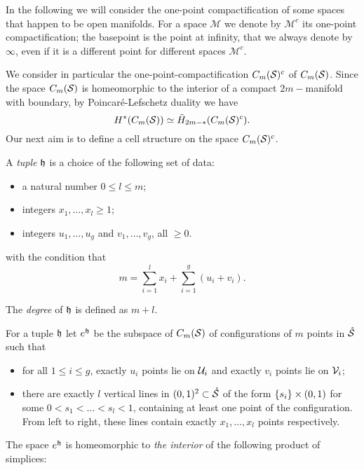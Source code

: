 In the following we will consider the one-point compactification of some spaces that
happen to be open manifolds. For a space $\mathcal{M}$ we denote by $\mathcal{M}^c$ its one-point
compactification; the basepoint is the point at infinity, that we always denote by $\infty$, even
if it is a different point for different spaces $\mathcal{M}^c$.

We consider in particular the one-point-compactification $C_m(\mathcal{S})^c$ of $C_m(\mathcal{S})$.
Since the space $C_m(\mathcal{S})$ is homeomorphic to the interior of a compact
$2m-$manifold with boundary, by Poincaré-Lefschetz
duality we have
\[
 H^*(C_m(\mathcal{S}))\simeq \tilde H_{2m-*}(C_m(\mathcal{S})^c).
\]
Our next aim is to define a cell structure on the space $C_m(\mathcal{S})^c$.
\begin{defn}
\label{defn:ehopen}
A \emph{tuple} $\mathfrak{h}$ is a choice of the following set of data:
 \begin{itemize}
  \item a natural number $0\leq l\leq m$;
  \item integers $x_1,\dots,x_l\geq 1$;
  \item integers $u_1,\dots,u_g$ and $v_1,\dots,v_g$, all $\geq 0$.
 \end{itemize}
with the condition that
\[
 m=\sum_{i=1}^lx_i+\sum_{i=1}^g(u_i+v_i).
\]

The \emph{degree} of $\mathfrak{h}$ is defined as $m+l$.

For a tuple $\mathfrak{h}$ let $e^{\mathfrak{h}}$ be the subspace
of $C_m(\mathcal{S})$ of configurations of $m$ points in $\mathring{\mathcal{S}}$ such that
\begin{itemize}
 \item for all $1\leq i\leq g$, exactly $u_i$ points lie on $\mathcal{U}_i$
 and exactly $v_i$ points lie on $\mathcal{V}_i$;
 \item there are exactly $l$ vertical lines in $(0,1)^2\subset\mathring{\mathcal{S}}$ of the
 form $\left\{s_i\right\}\times(0,1)$ for some $0<s_1<\dots<s_l<1$, containing at least one
 point of the configuration. From left to right, these lines contain exactly $x_1,\dots,x_l$ points
 respectively.
\end{itemize}
\end{defn}
The space $e^{\mathfrak{h}}$ is homeomorphic to \emph{the interior} of the following product of simplices:

